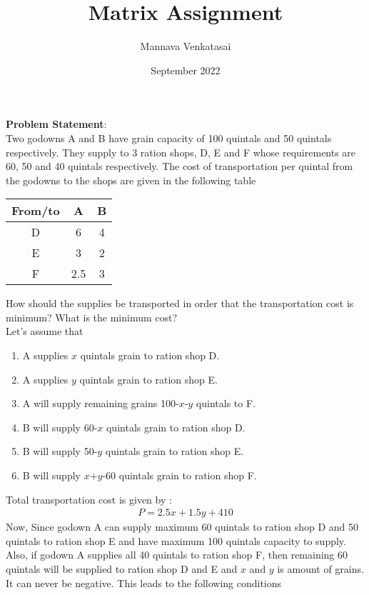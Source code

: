 \documentclass[journal,10pt,twocolumn]{article}
\title{\textbf{Matrix Assignment}}
\author{Mannava Venkatasai}
\date{September 2022}
\begin{document}
\maketitle
\raggedright \textbf{Problem Statement}: \vspace{3mm} \\
\fi
Two godowns A and B have grain capacity of 100 quintals and 50 quintals
respectively. They supply to 3 ration shops, D, E and F whose requirements are
60, 50 and 40 quintals respectively. The cost of transportation per quintal from
the godowns to the shops are given in the following table
\begin{table}[!ht]
	\centering
\begin{tabular}{|c|c|c|}
\hline
 From/to & A& B  \\ 
 \hline
 D & 6 & 4 \\  
 \hline
 E & 3  & 2 \\
 \hline
  F & 2.5 & 3 \\
 \hline
\end{tabular} 
\end{table} 
\vspace{5mm}
How should the supplies be transported in order that the transportation cost is minimum? What is the minimum cost?
\\
\solution
Let's assume that 
\begin{enumerate}
\item A supplies $x$ quintals grain to ration shop D.
\item A supplies $y$ quintals grain to ration shop E.
\item A will supply remaining grains 100-$x$-$y$ quintals to F.
\item B will supply 60-$x$ quintals grain to ration shop D. 
\item B will supply 50-$y$ quintals grain to ration shop E.
\item B will supply $x$+$y$-60 quintals grain to ration shop F.
\end{enumerate}
Total transportation cost is given by :
\begin{align}
P=2.5x+1.5y+410
\end{align}
Now, Since godown A can supply maximum 60 quintals to ration shop D and 50 quintals to ration shop E and have maximum 100 quintals capacity to supply.\vspace{2mm} \\ Also, if godown A supplies all 40 quintals to ration shop F, then remaining 60 quintals will be supplied to ration shop D and E and $x$ and $y$ is amount of grains. It can never be negative.  This leads to the following conditions
\end{document}
